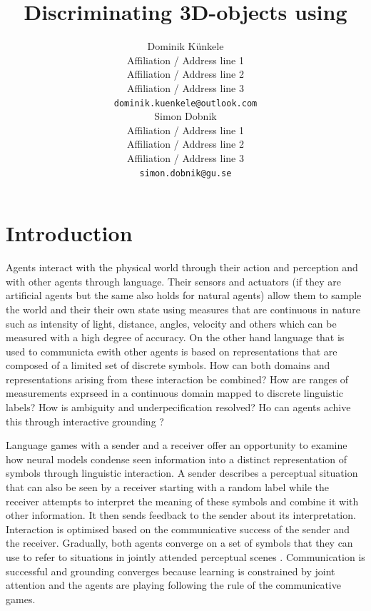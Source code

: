 \documentclass[11pt]{article}
\title{Discriminating 3D-objects using }
\author{Dominik Künkele \\
  Affiliation / Address line 1 \\
  Affiliation / Address line 2 \\
  Affiliation / Address line 3 \\
  \texttt{dominik.kuenkele@outlook.com} \\\And
  Simon Dobnik \\
  Affiliation / Address line 1 \\
  Affiliation / Address line 2 \\
  Affiliation / Address line 3 \\
  \texttt{simon.dobnik@gu.se} \\}
\begin{document}
\maketitle
\begin{abstract}

\end{abstract}

\section{Introduction}

Agents interact with the physical world through their action and perception and with other agents through language.
Their sensors and actuators (if they are artificial agents but the same also holds for natural agents) allow them to sample the world and their their own state using measures that are continuous in nature such as intensity of light, distance, angles, velocity and others which can be measured with a high degree of accuracy.
On the other hand language that is used to communicta ewith other agents is based on representations that are composed of a limited set of discrete symbols.
How can both domains and representations arising from these interaction be combined? How are ranges of measurements exprseed in a continuous domain mapped to discrete linguistic labels?
How is ambiguity and underpecification resolved?
Ho can agents achive this through interactive grounding \citep{Regier:1996,Roy:2005,Cooper:2023aa}?



Language games with a sender and a receiver \citep{Clark:1996aa,Bartlett:2005aa,Kirby:2008ab,SteelsLoetzsch:2009,Zaslavsky:2018aa} offer an opportunity to examine how neural models condense seen information into a distinct representation of symbols through linguistic interaction.
A sender describes a perceptual situation that can also be seen by a receiver starting with a random label while
the receiver attempts to interpret the meaning of these symbols and combine it with other information.
It then sends feedback to the sender about its interpretation.
Interaction is optimised based on the communicative success of the sender and the receiver.
Gradually, both agents converge on a set of symbols that they can use to refer to situations in jointly attended perceptual scenes \citep{Chai:2016aa,Kelleher:2020aa}.
Communication is successful and grounding converges because learning is constrained by joint attention and the agents are playing following the rule of the communicative games.
\end{document}
